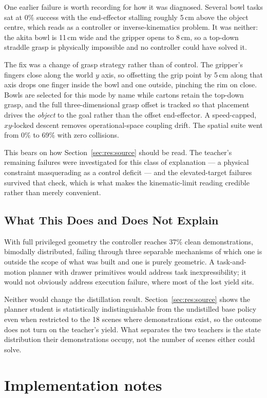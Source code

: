 \documentclass[a4paper,11pt]{report}
\begin{document}
One earlier failure is worth recording for how it was diagnosed. Several bowl tasks sat at 0\%
success with the end-effector stalling roughly 5\,cm above the object centre, which reads as a
controller or inverse-kinematics problem. It was neither: the akita bowl is 11\,cm wide and the
gripper opens to 8\,cm, so a top-down straddle grasp is physically impossible and no controller
could have solved it.

The fix was a change of grasp strategy rather than of control. The gripper's fingers close along
the world $y$ axis, so offsetting the grip point by 5\,cm along that axis drops one finger inside
the bowl and one outside, pinching the rim on close. Bowls are selected for this mode by name while
cartons retain the top-down grasp, and the full three-dimensional grasp offset is tracked so that
placement drives the \emph{object} to the goal rather than the offset end-effector. A speed-capped,
$xy$-locked descent removes operational-space coupling drift. The spatial suite went from 0\% to
69\% with zero collisions.

This bears on how Section~\ref{sec:res:source} should be read. The teacher's remaining failures were
investigated for this class of explanation --- a physical constraint masquerading as a control
deficit --- and the elevated-target failures survived that check, which is what makes the
kinematic-limit reading credible rather than merely convenient.

\section{What This Does and Does Not Explain}

With full privileged geometry the controller reaches 37\% clean demonstrations, bimodally
distributed, failing through three separable mechanisms of which one is outside the scope of what
was built and one is purely geometric. A task-and-motion planner with drawer primitives would
address task inexpressibility; it would not obviously address execution failure, where most of the
lost yield sits.

Neither would change the distillation result. Section~\ref{sec:res:source} shows the planner
student is statistically indistinguishable from the undistilled base policy even when restricted to
the 18 scenes where demonstrations exist, so the outcome does not turn on the teacher's yield. What
separates the two teachers is the state distribution their demonstrations occupy, not the number of
scenes either could solve.


\chapter{Implementation notes}
\end{document}

